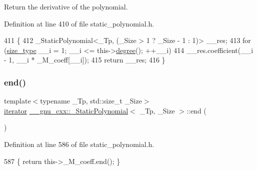 Return the derivative of the polynomial. 

Definition at line 410 of file static\+\_\+polynomial.\+h.


\begin{DoxyCode}
411       \{
412         \_StaticPolynomial<\_Tp, (\_Size > 1 ? \_Size - 1 : 1)> \_\_res;
413         \textcolor{keywordflow}{for} (\hyperlink{class____gnu__cxx_1_1__StaticPolynomial_a0cc0aa4adab35686ef2474e07f511ff9}{size\_type} \_\_i = 1; \_\_i <= this->\hyperlink{class____gnu__cxx_1_1__StaticPolynomial_a5977dac3a84e8a43f3e9da28b62ca46a}{degree}(); ++\_\_i)
414           \_\_res.coefficient(\_\_i - 1, \_\_i * \_M\_coeff[\_\_i]);
415         \textcolor{keywordflow}{return} \_\_res;
416       \}
\end{DoxyCode}
\mbox{\label{class____gnu__cxx_1_1__StaticPolynomial_aa927727967fb2b7224742a31df4af1ff}} 
\subsubsection{\texorpdfstring{end()}{end()}\hspace{0.1cm}{\footnotesize\ttfamily [1/2]}}
{\footnotesize\ttfamily template$<$typename \+\_\+\+Tp, std\+::size\+\_\+t \+\_\+\+Size$>$ \\
\hyperlink{class____gnu__cxx_1_1__StaticPolynomial_af042e6cdb307879fbfe357c13a843c7c}{iterator} \hyperlink{class____gnu__cxx_1_1__StaticPolynomial}{\+\_\+\+\_\+gnu\+\_\+cxx\+::\+\_\+\+Static\+Polynomial}$<$ \+\_\+\+Tp, \+\_\+\+Size $>$\+::end (\begin{DoxyParamCaption}{ }\end{DoxyParamCaption})\hspace{0.3cm}{\ttfamily [inline]}}



Definition at line 586 of file static\+\_\+polynomial.\+h.


\begin{DoxyCode}
587       \{ \textcolor{keywordflow}{return} this->\_M\_coeff.end(); \}
\end{DoxyCode}
\mbox{\label{class____gnu__cxx_1_1__StaticPolynomial_a3f97ba2b07743090c16217a5bc61fb77}} 
